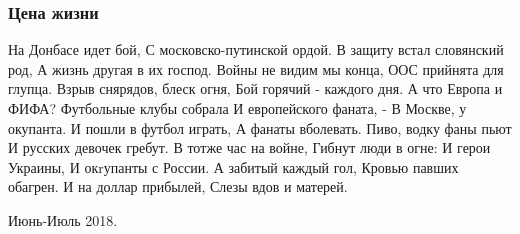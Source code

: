  
 
 

\subsubsection{Цена жизни}
\label{sec:poetry.rus.sokor.cena_zhizni}

На Донбасе идет бой,
С московско-путинской ордой.
В защиту встал словянский род,
А жизнь другая в их господ.
Войны не видим мы конца,
ООС прийнята для глупца.
Взрыв снярядов, блеск огня,
Бой горячий - каждого дня.
А что Европа и ФИФА?
Футбольные клубы собрала
И европейского фаната, -
В Москве, у окупанта.
И пошли в футбол играть,
А фанаты вболевать.
Пиво, водку фаны пьют
И русских девочек гребут.
В тотже час на войне,
Гибнут люди в огне:
И герои Украины,
И окrупанты с России.
А забитый каждый гол,
Кровью павших обагрен.
И на доллар прибылей,
Слезы вдов и матерей.

Июнь-Июль 2018.
